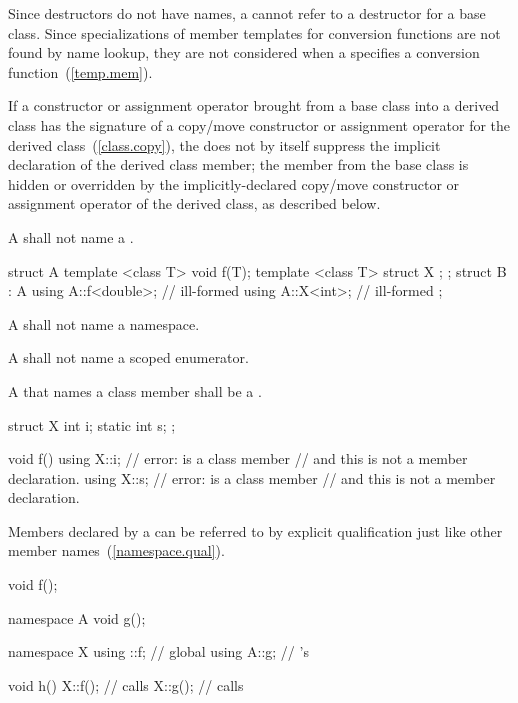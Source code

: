 \pnum
\begin{note}
Since destructors do not have names, a
 cannot refer to a
destructor for a base class. Since specializations of member templates
for conversion functions are not found by name lookup, they are not
considered when a  specifies a conversion
function~(\ref{temp.mem}).
\end{note}
If a constructor or assignment operator brought from a base class into a derived class
has the signature of a copy/move constructor or assignment operator
for the derived class~(\ref{class.copy}),
the  does not by itself
suppress the implicit declaration of the derived class member;
the member from the base class is hidden or overridden
by the implicitly-declared copy/move constructor or assignment operator
of the derived class, as described below.

\pnum
A  shall not name a .
\begin{example}

\begin{codeblock}
struct A {
  template <class T> void f(T);
  template <class T> struct X { };
};
struct B : A {
  using A::f<double>;           // ill-formed
  using A::X<int>;              // ill-formed
};
\end{codeblock}
\end{example}

\pnum
A  shall not name a namespace.

\pnum
A  shall not name a scoped enumerator.

\pnum
A  that names a class member shall be a
.
\begin{example}

\begin{codeblock}
struct X {
  int i;
  static int s;
};

void f() {
  using X::i;       // error:  is a class member
                    // and this is not a member declaration.
  using X::s;       // error:  is a class member
                    // and this is not a member declaration.
}
\end{codeblock}
\end{example}

\pnum
Members declared by a  can be referred to by
explicit qualification just like other member
names~(\ref{namespace.qual}).
\begin{example}

\begin{codeblock}
void f();

namespace A {
  void g();
}

namespace X {
  using ::f;        // global 
  using A::g;       // 's 
}

void h()
{
  X::f();           // calls 
  X::g();           // calls 
}
\end{codeblock}
\end{example}


